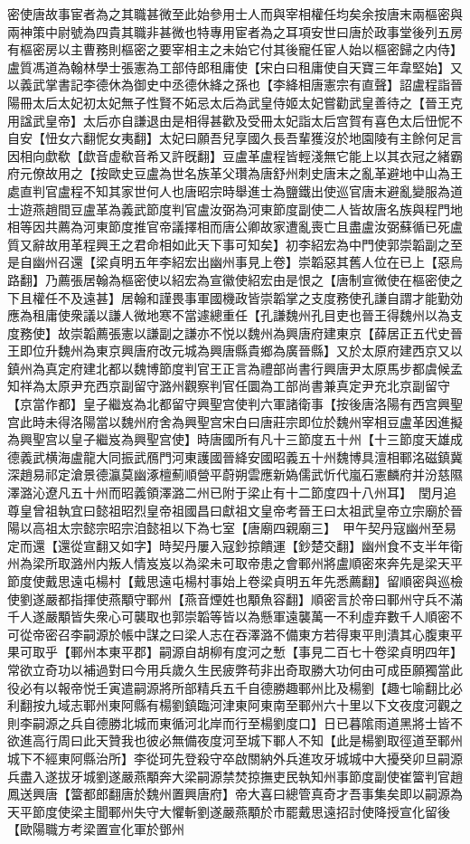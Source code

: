 密使唐故事宦者為之其職甚微至此始參用士人而與宰相權任均矣余按唐末兩樞密與兩神策中尉號為四貴其職非甚微也特專用宦者為之耳項安世曰唐於政事堂後列五房有樞密房以主曹務則樞密之要宰相主之未始它付其後寵任宦人始以樞密歸之内侍】盧質馮道為翰林學士張憲為工部侍郎租庸使【宋白曰租庸使自天寶三年韋堅始】又以義武掌書記李德休為御史中丞德休絳之孫也【李絳相唐憲宗有直聲】詔盧程詣晉陽冊太后太妃初太妃無子性賢不妬忌太后為武皇侍姬太妃嘗勸武皇善待之【晉王克用諡武皇帝】太后亦自謙退由是相得甚歡及受冊太妃詣太后宫賀有喜色太后忸怩不自安【忸女六翻怩女夷翻】太妃曰願吾兒享國久長吾輩獲沒於地園陵有主餘何足言因相向歔欷【歔音虚欷音希又許旣翻】豆盧革盧程皆輕淺無它能上以其衣冠之緒霸府元僚故用之【按歐史豆盧為世名族革父瓚為唐舒州刺史唐末之亂革避地中山為王處直判官盧程不知其家世何人也唐昭宗時舉進士為鹽鐵出使巡官唐末避亂變服為道士遊燕趙間豆盧革為義武節度判官盧汝弼為河東節度副使二人皆故唐名族與程門地相等因共薦為河東節度推官帝議擇相而唐公卿故家遭亂喪亡且盡盧汝弼蘇循已死盧質又辭故用革程興王之君命相如此天下事可知矣】初李紹宏為中門使郭崇韜副之至是自幽州召還【梁貞明五年李紹宏出幽州事見上卷】崇韜惡其舊人位在已上【惡烏路翻】乃薦張居翰為樞密使以紹宏為宣徽使紹宏由是恨之【唐制宣微使在樞密使之下且權任不及遠甚】居翰和謹畏事軍國機政皆崇韜掌之支度務使孔謙自謂才能勤効應為租庸使衆議以謙人微地寒不當遽總重任【孔謙魏州孔目吏也晉王得魏州以為支度務使】故崇韜薦張憲以謙副之謙亦不悦以魏州為興唐府建東京【薛居正五代史晉王即位升魏州為東京興唐府改元城為興唐縣貴鄉為廣晉縣】又於太原府建西京又以鎮州為真定府建北都以魏博節度判官王正言為禮部尚書行興唐尹太原馬步都虞候孟知祥為太原尹充西京副留守潞州觀察判官任圜為工部尚書兼真定尹充北京副留守【京當作都】皇子繼岌為北都留守興聖宫使判六軍諸衛事【按後唐洛陽有西宫興聖宫此時未得洛陽當以魏州府舍為興聖宫宋白曰唐莊宗即位於魏州宰相豆盧革因進擬為興聖宫以皇子繼岌為興聖宫使】時唐國所有凡十三節度五十州【十三節度天雄成德義武横海盧龍大同振武鴈門河東護國晉絳安國昭義五十州魏博具澶相鄆洺磁鎮冀深趙易祁定滄景德瀛莫幽涿檀薊順營平蔚朔雲應新媯儒武忻代嵐石憲麟府并汾慈隰澤潞沁遼凡五十州而昭義領澤潞二州已附于梁止有十二節度四十八州耳】　閏月追尊皇曾祖執宜曰懿祖昭烈皇帝祖國昌曰獻祖文皇帝考晉王曰太祖武皇帝立宗廟於晉陽以高祖太宗懿宗昭宗洎懿祖以下為七室【唐廟四親廟三】　甲午契丹寇幽州至易定而還【還從宣翻又如字】時契丹屢入寇鈔掠饋運【鈔楚交翻】幽州食不支半年衛州為梁所取潞州内叛人情岌岌以為梁未可取帝患之會鄆州將盧順密來奔先是梁天平節度使戴思遠屯楊村【戴思遠屯楊村事始上卷梁貞明五年先悉薦翻】留順密與巡檢使劉遂嚴都指揮使燕顒守鄆州【燕音煙姓也顒魚容翻】順密言於帝曰鄆州守兵不滿千人遂嚴顒皆失衆心可襲取也郭崇韜等皆以為懸軍遠襲萬一不利虛弃數千人順密不可從帝密召李嗣源於帳中謀之曰梁人志在吞澤潞不備東方若得東平則潰其心腹東平果可取乎【鄆州本東平郡】嗣源自胡柳有度河之慙【事見二百七十卷梁貞明四年】常欲立奇功以補過對曰今用兵歲久生民疲弊苟非出奇取勝大功何由可成臣願獨當此役必有以報帝悦壬寅遣嗣源將所部精兵五千自德勝趣鄆州比及楊劉【趣七喻翻比必利翻按九域志鄆州東阿縣有楊劉鎮臨河津東阿東南至鄆州六十里以下文夜度河觀之則李嗣源之兵自德勝北城而東循河北岸而行至楊劉度口】日已暮隂雨道黑將士皆不欲進高行周曰此天贊我也彼必無備夜度河至城下鄆人不知【此是楊劉取徑道至鄆州城下不經東阿縣治所】李從珂先登殺守卒啟關納外兵進攻牙城城中大擾癸卯旦嗣源兵盡入遂拔牙城劉遂嚴燕顒奔大梁嗣源禁焚掠撫吏民執知州事節度副使崔簹判官趙鳳送興唐【簹都郎翻唐於魏州置興唐府】帝大喜曰總管真奇才吾事集矣即以嗣源為天平節度使梁主聞鄆州失守大懼斬劉遂嚴燕顒於市罷戴思遠招討使降授宣化留後【歐陽職方考梁置宣化軍於鄧州